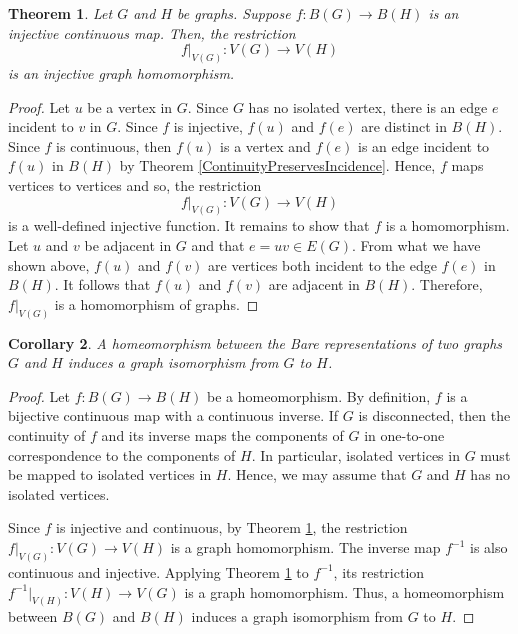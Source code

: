 \documentclass{amsart}
\newtheorem{theorem}{Theorem}[section]
\newtheorem{corollary}[theorem]{Corollary}
\theoremstyle{definition}
\theoremstyle{remark}
\numberwithin{equation}{section}
\begin{document}
	\begin{theorem}
		\label{injective continuous maps are homomorphism}
		Let \(G\) and \(H\) be graphs. Suppose \(f: B(G) \rightarrow B(H)\) is an injective continuous map. Then, the restriction
		\[
		f|_{V(G)}: V(G) \rightarrow V(H)
		\]
		is an injective graph homomorphism.
	\end{theorem}
	\begin{proof}
		Let \(u\) be a vertex in \(G\). Since \(G\) has no isolated vertex, there is an edge \(e\) incident to \(v\) in \(G\). Since \(f\) is injective, \(f(u)\) and \(f(e)\) are distinct in \(B(H)\). Since \(f\) is continuous, then \(f(u)\) is a vertex and \(f(e)\) is an edge incident to \(f(u)\) in \(B(H)\) by Theorem \ref{ContinuityPreservesIncidence}. Hence, \(f\) maps vertices to vertices and so, the restriction
		\[f|_{V(G)}:V(G) \rightarrow V(H)\]
		is a well-defined injective function. It remains to show that \(f\) is a homomorphism. Let \(u\) and \(v\) be adjacent in \(G\) and that \(e=uv \in E(G)\). From what we have shown above, \(f(u)\) and \(f(v)\) are vertices both incident to the edge \(f(e)\) in \(B(H)\). It follows that \(f(u)\) and \(f(v)\) are adjacent in \(B(H)\). Therefore, \(f|_{V(G)}\) is a homomorphism of graphs.
	\end{proof}
	
	\begin{corollary}
		A homeomorphism between the Bare representations of two graphs \(G\) and \(H\) induces a graph isomorphism from \(G\) to \(H\).
	\end{corollary}
	
	\begin{proof}
		Let \(f: B(G) \to B(H)\) be a homeomorphism. By definition, \(f\) is a bijective continuous map with a continuous inverse. If \(G\) is disconnected, then the continuity of \(f\) and its inverse maps the components of \(G\) in one-to-one correspondence to the components of \(H\). In particular, isolated vertices in \(G\) must be mapped to isolated vertices in \(H\). Hence, we may assume that \(G\) and \(H\) has no isolated vertices.
		
		Since \(f\) is injective and continuous, by Theorem \ref{injective continuous maps are homomorphism}, the restriction \(f|_{V(G)}: V(G) \to V(H)\) is a graph homomorphism. The inverse map \(f^{-1}\) is also continuous and injective. Applying Theorem \ref{injective continuous maps are homomorphism} to \(f^{-1}\), its restriction \(f^{-1}|_{V(H)}: V(H) \to V(G)\) is a graph homomorphism. Thus, a homeomorphism between \(B(G)\) and \(B(H)\) induces a graph isomorphism from \(G\) to \(H\).
	\end{proof}
	
\end{document}

